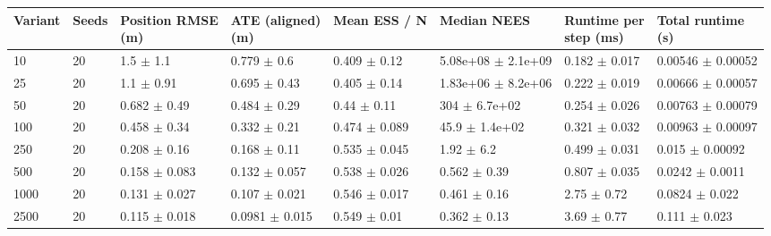 \begin{tabular}{llllllll}
\toprule
Variant & Seeds & \shortstack[l]{Position RMSE\\(m)} & \shortstack[l]{ATE (aligned)\\(m)} & Mean ESS / N & Median NEES & \shortstack[l]{Runtime per\\step (ms)} & \shortstack[l]{Total runtime\\(s)} \\
\midrule
10 & 20 & 1.5 $\pm$ 1.1 & 0.779 $\pm$ 0.6 & 0.409 $\pm$ 0.12 & 5.08e+08 $\pm$ 2.1e+09 & 0.182 $\pm$ 0.017 & 0.00546 $\pm$ 0.00052 \\
25 & 20 & 1.1 $\pm$ 0.91 & 0.695 $\pm$ 0.43 & 0.405 $\pm$ 0.14 & 1.83e+06 $\pm$ 8.2e+06 & 0.222 $\pm$ 0.019 & 0.00666 $\pm$ 0.00057 \\
50 & 20 & 0.682 $\pm$ 0.49 & 0.484 $\pm$ 0.29 & 0.44 $\pm$ 0.11 & 304 $\pm$ 6.7e+02 & 0.254 $\pm$ 0.026 & 0.00763 $\pm$ 0.00079 \\
100 & 20 & 0.458 $\pm$ 0.34 & 0.332 $\pm$ 0.21 & 0.474 $\pm$ 0.089 & 45.9 $\pm$ 1.4e+02 & 0.321 $\pm$ 0.032 & 0.00963 $\pm$ 0.00097 \\
250 & 20 & 0.208 $\pm$ 0.16 & 0.168 $\pm$ 0.11 & 0.535 $\pm$ 0.045 & 1.92 $\pm$ 6.2 & 0.499 $\pm$ 0.031 & 0.015 $\pm$ 0.00092 \\
500 & 20 & 0.158 $\pm$ 0.083 & 0.132 $\pm$ 0.057 & 0.538 $\pm$ 0.026 & 0.562 $\pm$ 0.39 & 0.807 $\pm$ 0.035 & 0.0242 $\pm$ 0.0011 \\
1000 & 20 & 0.131 $\pm$ 0.027 & 0.107 $\pm$ 0.021 & 0.546 $\pm$ 0.017 & 0.461 $\pm$ 0.16 & 2.75 $\pm$ 0.72 & 0.0824 $\pm$ 0.022 \\
2500 & 20 & 0.115 $\pm$ 0.018 & 0.0981 $\pm$ 0.015 & 0.549 $\pm$ 0.01 & 0.362 $\pm$ 0.13 & 3.69 $\pm$ 0.77 & 0.111 $\pm$ 0.023 \\
\bottomrule
\end{tabular}
